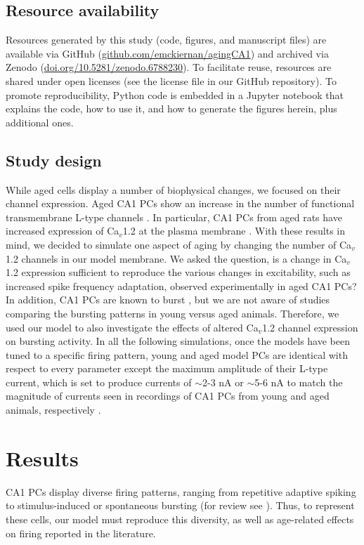 \documentclass[12pt]{article}
\begin{document}
\subsection{Resource availability}
Resources generated by this study (code, figures, and manuscript files) are available via GitHub (\href{https://github.com/emckiernan/agingCA1}{github.com/emckiernan/agingCA1}) and archived via Zenodo (\href{https://doi.org/10.5281/zenodo.6788230}{doi.org/10.5281/zenodo.6788230}). To facilitate reuse, resources are shared under open licenses (see the license file in our GitHub repository). To promote reproducibility, Python code is embedded in a Jupyter notebook \cite{kluyver2016jupyter} that explains the code, how to use it, and how to generate the figures herein, plus additional ones.

\subsection{Study design}
While aged cells display a number of biophysical changes, we focused on their {\Ca} channel expression. Aged CA1 PCs show an increase in the number of functional transmembrane L-type {\Ca} channels  \citep{herman1998up,thibault1996increase,veng2002regionally}. In particular, CA1 PCs from aged rats have increased expression of Ca$_v$1.2 at the plasma membrane \citep{nunez2014surface}. With these results in mind, we decided to simulate one aspect of aging by changing the number of Ca$_v$1.2 channels in our model membrane. We asked the question, is a change in Ca$_v$1.2 expression sufficient to reproduce the various changes in excitability, such as increased spike frequency adaptation, observed experimentally in aged CA1 PCs? In addition, CA1 PCs are known to burst \citep{mckiernan2017ca1}, but we are not aware of studies comparing the bursting patterns in young versus aged animals. Therefore, we used our model to also investigate the effects of altered Ca$_v$1.2 channel expression on bursting activity. In all the following simulations, once the models have been tuned to a specific firing pattern, young and aged model PCs are identical with respect to every parameter except the maximum amplitude of their L-type {\Ca} current, which is set to produce currents of $\sim$2-3 nA or $\sim$5-6 nA to match the magnitude of currents seen in recordings of CA1 PCs from young and aged animals, respectively \cite{campbell1996aging}. 

\section{Results}
CA1 PCs display diverse firing patterns, ranging from repetitive adaptive spiking to stimulus-induced or spontaneous bursting (for review see \cite{mckiernan2017ca1}). Thus, to represent these cells, our model must reproduce this diversity, as well as age-related effects on firing reported in the literature.  
\end{document}
